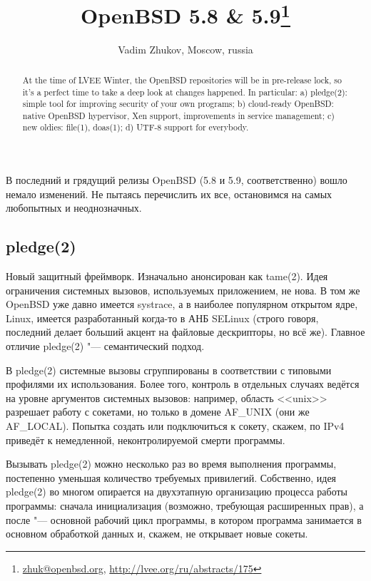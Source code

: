\documentclass[10pt, a5paper]{article}
\begin{document}
\title{OpenBSD 5.8 \& 5.9\footnote{\url{zhuk@openbsd.org}, \url{http://lvee.org/ru/abstracts/175}}}
\author{Vadim Zhukov, Moscow, russia}
\maketitle
\begin{abstract}
At the time of LVEE Winter, the OpenBSD repositories will be in pre-release lock, so it's a perfect time to take a deep look at changes happened. In particular: a) pledge(2): simple tool for improving security of your own programs; b) cloud-ready OpenBSD: native OpenBSD hypervisor, Xen support, improvements in service management; c) new oldies: file(1), doas(1); d) UTF-8 support for everybody.
\end{abstract}

В последний и грядущий релизы OpenBSD (5.8 и 5.9, соответственно) вошло немало изменений. Не пытаясь перечислить их все, остановимся на самых любопытных и неоднозначных.

\subsection*{pledge(2)}

Новый защитный фреймворк. Изначально анонсирован как \linebreak tame(2). Идея ограничения системных вызовов, используемых приложением, не нова. В том же OpenBSD уже давно имеется systrace, а в наиболее популярном открытом ядре, Linux, имеется разработанный когда-то в АНБ SELinux (строго говоря, последний делает больший акцент на файловые дескрипторы, но всё же). Главное отличие pledge(2) "--- семантический подход.

В pledge(2) системные вызовы сгруппированы в соответствии с типовыми профилями их использования. Более того, контроль в отдельных случаях ведётся на уровне аргументов системных вызовов: например, область <<unix>> разрешает работу с сокетами, но только в домене AF\_UNIX (они же AF\_LOCAL). Попытка создать или подключиться к сокету, скажем, по IPv4 приведёт к немедленной, неконтролируемой смерти программы.

Вызывать pledge(2) можно несколько раз во время выполнения программы, постепенно уменьшая количество требуемых привилегий. Собственно, идея pledge(2) во многом опирается на двухэтапную организацию процесса работы программы: сначала инициализация (возможно, требующая расширенных прав), а после "--- основной рабочий цикл программы, в котором программа занимается в основном обработкой данных и, скажем, не открывает новые сокеты.
\end{document}
